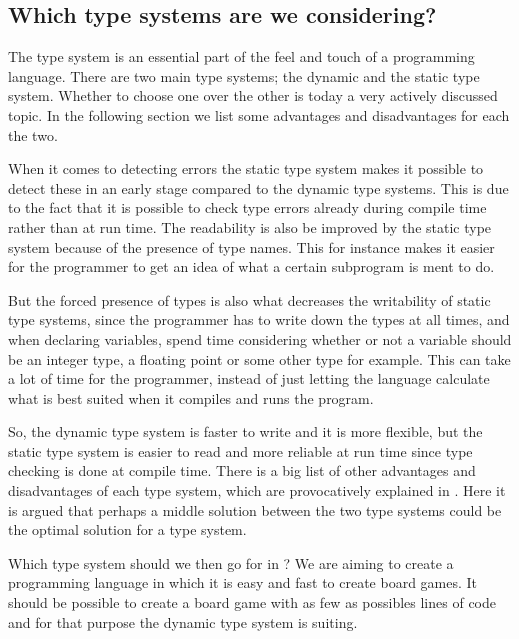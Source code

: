 \subsection{Which type systems are we considering?}
\label{sec:typesystemanalysis}

The type system is an essential part of the feel and touch of a programming
language. There are two main type systems; the dynamic and the static
type system. Whether to choose one over the other is today a very
actively discussed topic. In the following section we list some advantages and
disadvantages for each the two.

When it comes to detecting errors the static type system makes it possible to
detect these in an early stage compared to the dynamic type systems. This is
due to the fact that it is possible to check type errors already during
compile time rather than at run time. The readability is also be improved by
the static type system because of the presence of type names. This for instance
makes it easier for the programmer to get an idea of what a certain
subprogram is ment to do.

But the forced presence of types is also what decreases the writability of static
type systems, since the programmer has to write down the types at all times, and
when declaring variables, spend time considering whether or not a variable
should be an integer type, a floating point or some other type for example. This can take
a lot of time for the programmer, instead of just letting the language calculate 
what is best suited when it compiles and runs the program.

So, the dynamic type system is faster to write and it is more flexible, but the
static type system is easier to read and more reliable at run time since type
checking is done at compile time. There is a big list of other advantages and
disadvantages of each type system, which are provocatively explained in
\cite{staticvsdynamictypesystem}. Here it is argued that perhaps a middle
solution between the two type systems could be the optimal solution for a type
system.

Which type system should we then go for in \productname{}? We are aiming to create a
programming language in which it is easy and fast to create board games. It
should be possible to create a board game with as few as possibles lines of code
and for that purpose the dynamic type system is suiting.

